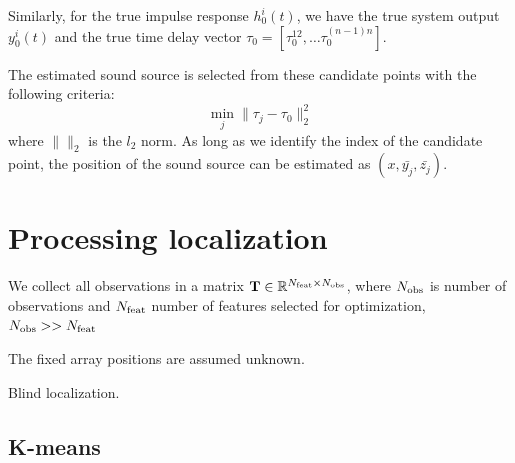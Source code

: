 \documentclass[journal]{IEEEtran}
\begin{document}
Similarly, for the true impulse response $h_0^i(t)$, we have the true system output $y_0^i(t)$ and the true time delay vector $\tau_0 = [\tau_0^{12}, \ldots \tau_0^{(n-1)n}]$.

The estimated sound source is selected from these candidate points with the following criteria: 
\begin{equation}
    \min_j \|\tau_j - \tau_0\|_2^2
\end{equation}
where $\| \|_2$ is the $l_2$ norm. As long as we identify the index of the candidate point, the position of the sound source can be estimated as  $(x, \bar{y_j}, \bar{z_j})$. 


\section{Processing localization}
We collect all observations in a matrix ${\bf T} \in \mathbb{R}^{N_{\rm feat}\times N_{\rm obs}}$, where $N_{\rm obs}$ is number of observations and $N_{\rm feat}$ number of features selected for optimization, $N_{\rm obs} >> N_{\rm feat}$

The fixed array positions are assumed unknown. 

Blind localization.


\subsection{K-means}
\end{document}

